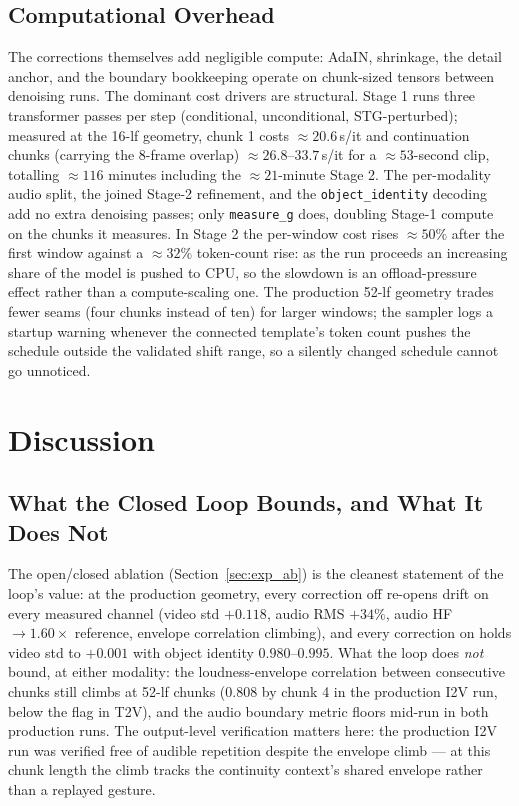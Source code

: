 \documentclass[12pt]{article}
\begin{document}
\subsection{Computational Overhead}
\label{sec:cost}

The corrections themselves add negligible compute: AdaIN, shrinkage, the
detail anchor, and the boundary bookkeeping operate on chunk-sized tensors
between denoising runs.  The dominant cost drivers are structural.  Stage 1
runs three transformer passes per step (conditional, unconditional,
STG-perturbed); measured at the 16-lf geometry, chunk 1 costs
$\approx20.6$\,s/it and continuation chunks (carrying the 8-frame overlap)
$\approx26.8$--$33.7$\,s/it for a $\approx53$-second clip, totalling
$\approx116$ minutes including the $\approx21$-minute Stage 2.  The
per-modality audio split, the joined Stage-2 refinement, and the
\texttt{object\_identity} decoding add no extra denoising passes; only
\texttt{measure\_g} does, doubling Stage-1 compute on the chunks it
measures.  In Stage 2 the per-window cost rises $\approx50\%$ after the
first window against a $\approx32\%$ token-count rise: as the run proceeds
an increasing share of the model is pushed to CPU, so the slowdown is an
offload-pressure effect rather than a compute-scaling one.  The production
52-lf geometry trades fewer seams (four chunks instead of ten) for larger
windows; the sampler logs a startup warning whenever the connected
template's token count pushes the schedule outside the validated shift
range, so a silently changed schedule cannot go unnoticed.

\section{Discussion}
\label{sec:discussion}

\subsection{What the Closed Loop Bounds, and What It Does Not}
The open/closed ablation (Section~\ref{sec:exp_ab}) is the cleanest statement
of the loop's value: at the production geometry, every correction off
re-opens drift on every measured channel (video std $+0.118$, audio RMS
$+34\%$, audio HF $\to1.60\times$ reference, envelope correlation climbing),
and every correction on holds video std to $+0.001$ with object identity
$0.980$--$0.995$.  What the loop does \emph{not} bound, at either modality:
the loudness-envelope correlation between consecutive chunks still climbs at
52-lf chunks ($0.808$ by chunk 4 in the production I2V run, below the flag
in T2V), and the audio boundary metric floors mid-run in both production
runs.  The output-level verification matters here: the production I2V run
was verified free of audible repetition despite the envelope climb --- at
this chunk length the climb tracks the continuity context's shared envelope
rather than a replayed gesture.
\end{document}
